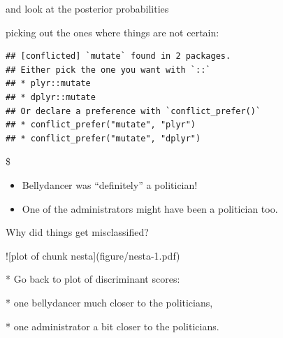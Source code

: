 \documentclass[ignorenonframetext,]{beamer}
\newenvironment{Shaded}{\begin{snugshade}}{\end{snugshade}}
\newcommand{\DataTypeTok}[1]{\textcolor[rgb]{0.13,0.29,0.53}{#1}}
\newcommand{\DecValTok}[1]{\textcolor[rgb]{0.00,0.00,0.81}{#1}}
\newcommand{\FloatTok}[1]{\textcolor[rgb]{0.00,0.00,0.81}{#1}}
\newcommand{\KeywordTok}[1]{\textcolor[rgb]{0.13,0.29,0.53}{\textbf{#1}}}
\newcommand{\NormalTok}[1]{#1}
\newcommand{\OperatorTok}[1]{\textcolor[rgb]{0.81,0.36,0.00}{\textbf{#1}}}
\newcommand{\StringTok}[1]{\textcolor[rgb]{0.31,0.60,0.02}{#1}}
\begin{document}
\begin{frame}[fragile]{and look at the posterior probabilities}
\protect\hypertarget{and-look-at-the-posterior-probabilities}{}

picking out the ones where things are not certain:

\begin{Shaded}
\end{Shaded}

\begin{verbatim}
## [conflicted] `mutate` found in 2 packages.
## Either pick the one you want with `::` 
## * plyr::mutate
## * dplyr::mutate
## Or declare a preference with `conflict_prefer()`
## * conflict_prefer("mutate", "plyr")
## * conflict_prefer("mutate", "dplyr")
\end{verbatim}

\$

\begin{itemize}
\item
  Bellydancer was ``definitely'' a politician!
\item
  One of the administrators might have been a politician too.
\end{itemize}

\end{frame}

\begin{frame}{Why did things get misclassified?}
\protect\hypertarget{why-did-things-get-misclassified}{}

\begin{minipage}[t]{0.7\linewidth}
![plot of chunk nesta](figure/nesta-1.pdf)

       
\end{minipage}
\begin{minipage}[t]{0.28\linewidth}


* Go back to plot of discriminant scores:

* one bellydancer much closer to the politicians,

* one administrator a bit closer to the politicians.

\end{minipage}

\end{frame}
\end{document}
